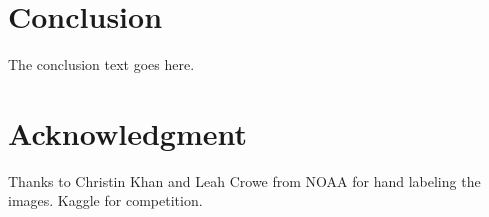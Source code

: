 \documentclass{IET}%
\begin{document}
\section{Conclusion}
The conclusion text goes here.

\section{Acknowledgment}

Thanks to Christin Khan and Leah Crowe from NOAA for hand labeling the images. 
Kaggle for competition.



%
%
%
%
%
%
%
%
%
%
%
%
%
\end{document}

